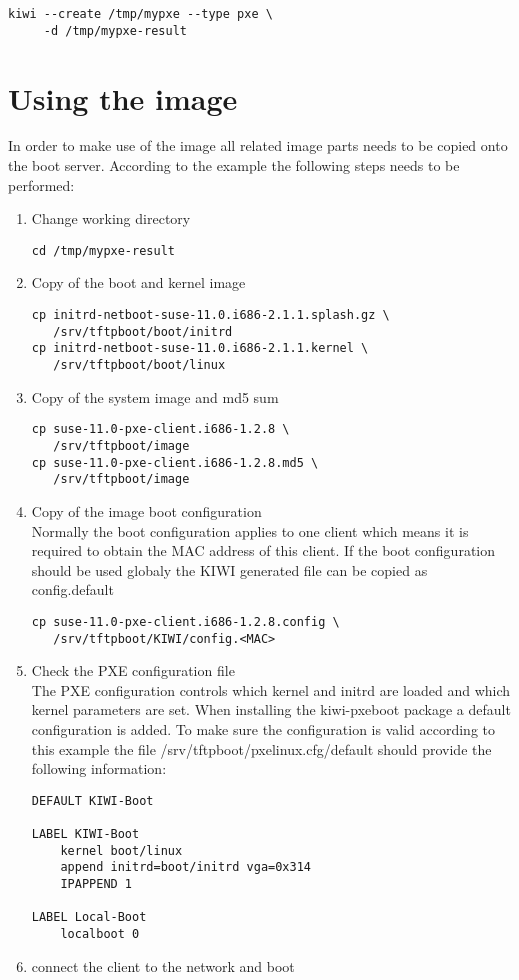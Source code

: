\begin{Command}{12cm}
\begin{verbatim}
kiwi --create /tmp/mypxe --type pxe \
     -d /tmp/mypxe-result
\end{verbatim}
\end{Command}

\section{Using the image}

In order to make use of the image all related image parts needs 
to be copied onto the boot server. According to the example the following
steps needs to be performed:

\begin{enumerate}
\item Change working directory
\begin{verbatim}
cd /tmp/mypxe-result
\end{verbatim}
\item Copy of the boot and kernel image
\begin{verbatim}
cp initrd-netboot-suse-11.0.i686-2.1.1.splash.gz \
   /srv/tftpboot/boot/initrd
cp initrd-netboot-suse-11.0.i686-2.1.1.kernel \
   /srv/tftpboot/boot/linux
\end{verbatim}
\item Copy of the system image and md5 sum
\begin{verbatim}
cp suse-11.0-pxe-client.i686-1.2.8 \
   /srv/tftpboot/image
cp suse-11.0-pxe-client.i686-1.2.8.md5 \
   /srv/tftpboot/image
\end{verbatim}
\item Copy of the image boot configuration\\
      Normally the boot configuration applies to one client which
      means it is required to obtain the MAC address of this client.
      If the boot configuration should be used globaly the KIWI
      generated file can be copied as config.default
\begin{verbatim}
cp suse-11.0-pxe-client.i686-1.2.8.config \
   /srv/tftpboot/KIWI/config.<MAC>
\end{verbatim}
\item Check the PXE configuration file\\
      The PXE configuration controls which kernel and initrd are
      loaded and which kernel parameters are set. When installing
      the kiwi-pxeboot package a default configuration is added.
      To make sure the configuration is valid according to this
      example the file /srv/tftpboot/pxelinux.cfg/default should
      provide the following information:
\begin{verbatim}
DEFAULT KIWI-Boot

LABEL KIWI-Boot
    kernel boot/linux
    append initrd=boot/initrd vga=0x314
    IPAPPEND 1

LABEL Local-Boot
    localboot 0
\end{verbatim}
\item connect the client to the network and boot
\end{enumerate}

